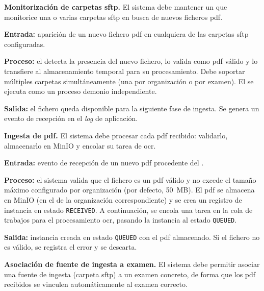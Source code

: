 \begin{functional}

    \item \textbf{Monitorización de carpetas \acs{sftp}.} \label{rf:ingestion:watcher}
    El sistema debe mantener un  que monitorice una o varias carpetas
    \acs{sftp} en busca de nuevos ficheros \acs{pdf}.

    \textbf{Entrada:} aparición de un nuevo fichero \acs{pdf} en cualquiera de las carpetas
    \acs{sftp} configuradas.

    \textbf{Proceso:} el  detecta la presencia del nuevo fichero, lo valida
    como \acs{pdf} válido y lo transfiere al almacenamiento temporal para su procesamiento.
    Debe soportar múltiples carpetas simultáneamente (una por organización o por examen). El
     se ejecuta como un proceso demonio independiente.

    \textbf{Salida:} el fichero queda disponible para la siguiente fase de ingesta. Se
    genera un evento de recepción en el \textit{log} de aplicación.

    \item \textbf{Ingesta de \acs{pdf}.} \label{rf:ingestion:ingest}
    El sistema debe procesar cada \acs{pdf} recibido: validarlo, almacenarlo en MinIO y
    encolar su tarea de \acs{ocr}.

    \textbf{Entrada:} evento de recepción de un nuevo \acs{pdf} procedente del
    .

    \textbf{Proceso:} el sistema valida que el fichero es un \acs{pdf} válido y no excede
    el tamaño máximo configurado por organización (por defecto, 50~MB). El \acs{pdf} se
    almacena en MinIO (en el  de la organización correspondiente) y se crea un
    registro de instancia en estado \texttt{RECEIVED}. A continuación, se encola una tarea
    en la cola de trabajos para el procesamiento \acs{ocr}, pasando la instancia al estado
    \texttt{QUEUED}.

    \textbf{Salida:} instancia creada en estado \texttt{QUEUED} con el \acs{pdf}
    almacenado. Si el fichero no es válido, se registra el error y se descarta.

    \item \textbf{Asociación de fuente de ingesta a examen.}
    \label{rf:ingestion:source}
    El sistema debe permitir asociar una fuente de ingesta (carpeta \acs{sftp}) a un examen
    concreto, de forma que los \acs{pdf} recibidos se vinculen automáticamente al examen
    correcto.


\end{functional}

